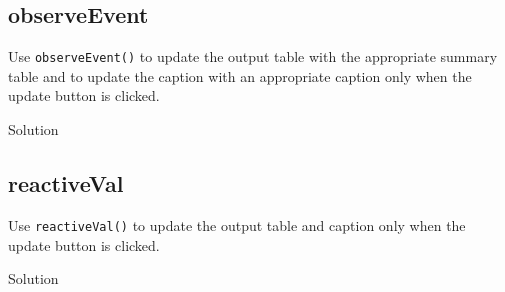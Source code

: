 \documentclass[
  oneside]{book}
\newenvironment{Shaded}{\begin{snugshade}}{\end{snugshade}}
\newcommand{\AttributeTok}[1]{\textcolor[rgb]{0.77,0.63,0.00}{#1}}
\newcommand{\ConstantTok}[1]{\textcolor[rgb]{0.00,0.00,0.00}{#1}}
\newcommand{\ControlFlowTok}[1]{\textcolor[rgb]{0.13,0.29,0.53}{\textbf{#1}}}
\newcommand{\FunctionTok}[1]{\textcolor[rgb]{0.00,0.00,0.00}{#1}}
\newcommand{\NormalTok}[1]{#1}
\newcommand{\OtherTok}[1]{\textcolor[rgb]{0.56,0.35,0.01}{#1}}
\newcommand{\SpecialCharTok}[1]{\textcolor[rgb]{0.00,0.00,0.00}{#1}}
\newcommand{\StringTok}[1]{\textcolor[rgb]{0.31,0.60,0.02}{#1}}
\begin{document}
\hypertarget{observeevent-2}{%
\subsection*{observeEvent}\label{observeevent-2}}

Use \texttt{observeEvent}\texttt{()} to update the output table with the appropriate summary table and to update the caption with an appropriate caption only when the update button is clicked.

Solution

\begin{Shaded}
\end{Shaded}

\hypertarget{reactiveval-1}{%
\subsection*{reactiveVal}\label{reactiveval-1}}

Use \texttt{reactiveVal}\texttt{()} to update the output table and caption only when the update button is clicked.

Solution
\end{document}
